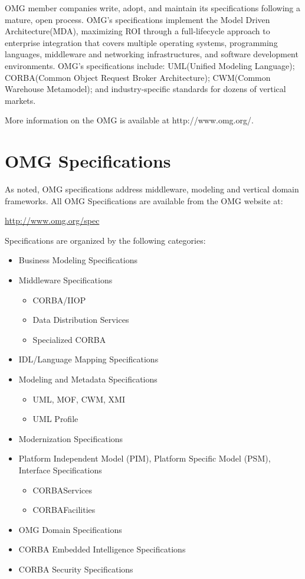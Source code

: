 \documentclass[10pt,%
\ifpretendfinal
final%
\else
draft%
\fi,
]{scrreprt}
\newcommand{\sectionWN}[1]{ \section*{#1}   \addcontentsline{toc}{section}{#1}  }
\begin{document}
OMG member companies write, adopt, and maintain its specifications following a mature, open process. OMG's specifications implement the Model Driven Architecture\textregistered\xspace (MDA\textregistered\xspace), maximizing ROI through a full-lifecycle approach to enterprise integration that covers multiple operating systems, programming languages, middleware and networking infrastructures, and software development environments. OMG's specifications include: UML\textregistered\xspace (Unified Modeling Language\texttrademark\xspace); CORBA\textregistered\xspace (Common Object Request Broker Architecture); CWM\texttrademark\xspace (Common Warehouse Metamodel); and industry-specific standards for dozens of vertical markets.

More information on the OMG is available at http://www.omg.org/.


\sectionWN{OMG Specifications}	

As noted, OMG specifications address middleware, modeling and vertical domain frameworks. All OMG Specifications are available from the OMG website at:

\url{http://www.omg.org/spec}

\noindent Specifications are organized by the following categories:
\begin{itemize}
	\item  Business Modeling Specifications
	\item Middleware Specifications
	\begin{itemize}
		\item CORBA/IIOP
		\item Data Distribution Services
		\item Specialized CORBA
	\end{itemize}				
	\item IDL/Language Mapping Specifications
	\item Modeling and Metadata Specifications
	\begin{itemize}	
		\item UML, MOF, CWM, XMI
		\item UML Profile										
	\end{itemize}			
	\item Modernization Specifications
	\item Platform Independent Model (PIM), Platform Specific Model (PSM), Interface Specifications
	\begin{itemize}	
		\item CORBAServices
		\item CORBAFacilities
	\end{itemize}			
	\item OMG Domain Specifications
	\item CORBA Embedded Intelligence Specifications
	\item CORBA Security Specifications
\end{itemize}	
\end{document}
